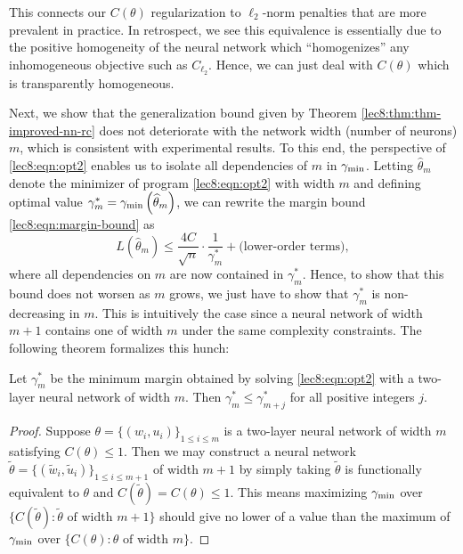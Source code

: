 This connects our $C(\theta)$ regularization to $\ell_2$-norm penalties that are more prevalent in practice. In retrospect, we see this equivalence is essentially due to the positive homogeneity of the neural network which ``homogenizes'' any inhomogeneous objective such as $C_{\ell_2}$. Hence, we can just deal with $C(\theta)$ which is transparently homogeneous.

 \label{sec:gen-bounds:decreasing-in-m}

Next, we show that the generalization bound given by Theorem \ref{lec8:thm:thm-improved-nn-rc} does not deteriorate with the network width (number of neurons) $m$, which is consistent with experimental results. To this end, the perspective of \eqref{lec8:eqn:opt2} enables us to isolate all dependencies of $m$ in $\gamma_{\mathrm{min}}$. Letting $\widehat \theta_m$ denote the minimizer of program \eqref{lec8:eqn:opt2} with width $m$ and defining optimal value $\gamma_m^* = \gamma_{\mathrm{min}}\left(\widehat \theta_m\right)$, we can rewrite the margin bound \eqref{lec8:eqn:margin-bound} as 
\begin{equation}
L(\widehat \theta_m) \le \frac{4C}{\sqrt{n}} \cdot \frac{1}{\gamma_m^*} + \text{(lower-order terms)},
\end{equation}
where all dependencies on $m$ are now contained in $\gamma_m^*$. Hence, to show that this bound does not worsen as $m$ grows, we just have to show that $\gamma_m^*$ is non-decreasing in $m$. This is intuitively the case since a neural network of width $m+1$ contains one of width $m$ under the same complexity constraints. The following theorem formalizes this hunch:

\begin{theorem}
Let $\gamma_m^*$ be the minimum margin obtained by solving \eqref{lec8:eqn:opt2} with a two-layer neural network of width $m$. Then $\gamma_m^* \leq \gamma_{m+j}^*$ for all positive integers $j$.
\end{theorem}

\begin{proof}
Suppose $\theta = \{(w_i, u_i)\}_{1 \leq i \leq m}$ is a two-layer neural network of width $m$ satisfying $C(\theta)\le 1$. Then we may construct a neural network $\widetilde \theta = \{(\tilde w_i, \tilde u_i)\}_{1 \leq i \leq m+1}$ of width $m+1$ by simply taking
$\widetilde \theta$ is functionally equivalent to $\theta$ and $C(\widetilde \theta) = C(\theta) \le 1$. This means maximizing $\gamma_{\mathrm{min}}$ over $\{C(\widetilde \theta): \widetilde \theta\text{ of width }m+1\}$ should give no lower of a value than the maximum of $\gamma_{\mathrm{min}}$ over $\{C(\theta): \theta\text{ of width }m\}$.
\end{proof}

